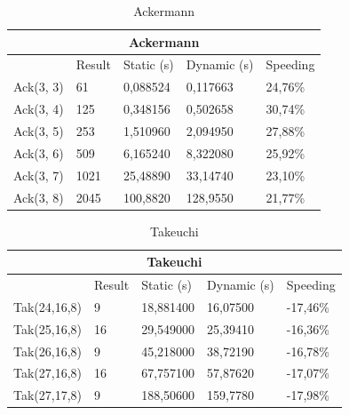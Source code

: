 \documentclass[ack,preface]{dithesis}
\begin{document}
\begin{table}[h!]
\centering
\begin{tabular}{ |p{3cm}||p{2cm}|p{3cm}|p{3cm}||p{2cm}|  }

 \hline
 \multicolumn{5}{|c|}{\textbf{\footnotesize Ackermann}} \\
 \hline
 	& Result &Static (s)&Dynamic (s)&Speeding\\
 \hline
 Ack(3, 3) & 61      &0,088524    &  0,117663    &   24,76\%\\
 Ack(3, 4) & 125    &0,348156    &  0,502658    &  30,74\%\\
 Ack(3, 5) & 253    & 1,510960   &  2,094950    &   27,88\%\\
 Ack(3, 6) & 509    & 6,165240   &  8,322080    &   25,92\%\\
 Ack(3, 7) & 1021  & 25,48890   &  33,14740  &   23,10\%\\
 Ack(3, 8) & 2045  &100,8820    &  128,9550  &  21,77\%\\
 \hline
\end{tabular}
\caption{Ackermann}
\label{table:1}
\end{table}

\begin{table}[h!]
\centering
\begin{tabular}{ |p{3cm}||p{2cm}|p{3cm}|p{3cm}||p{2.5cm}|  }

 \hline
 \multicolumn{5}{|c|}{\textbf{\footnotesize Takeuchi}} \\
 \hline
 	& Result &Static (s)&Dynamic (s)&Speeding\\
 \hline
 Tak(24,16,8) & 9    &  18,881400   &  16,07500     &  -17,46\%\\
 Tak(25,16,8) & 16  &  29,549000   &  25,39410     &  -16,36\%\\
 Tak(26,16,8) & 9    &  45,218000   &  38,72190    &   -16,78\%\\
 Tak(27,16,8) & 16  &  67,757100   &  57,87620    &   -17,07\%\\
 Tak(27,17,8) & 9    &  188,50600  & 159,7780   &  -17,98\%\\
 \hline
\end{tabular}
\caption{Takeuchi}
\label{table:1}
\end{table}
\end{document}
